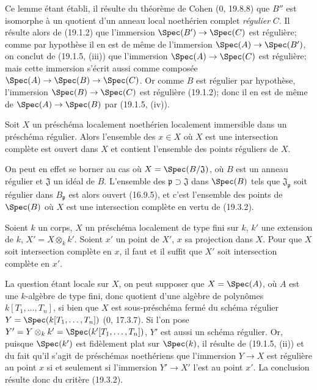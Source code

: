 Ce lemme étant établi, il résulte du théorème de Cohen ($0$, 19.8.8) que $B''$ est isomorphe à un quotient d'un anneau local noethérien complet \emph{régulier} $C$. Il résulte alors de (19.1.2) que l'immersion $\Spec(B')\to\Spec(C)$ est régulière; comme par hypothèse il en est de même de l'immersion $\Spec(A)\to\Spec(B')$, on conclut de (19.1.5, (iii)) que l'immersion $\Spec(A)\to\Spec(C)$ est régulière; mais cette immersion s'écrit aussi comme composée $\Spec(A)\to\Spec(B)\to\Spec(C)$. Or comme $B$ est régulier par hypothèse, l'immersion $\Spec(B)\to\Spec(C)$ est régulière (19.1.2); donc il en est de même de $\Spec(A)\to\Spec(B)$ par (19.1.5, (iv)).

\begin{corollary}[19.3.3]
\label{IV.19.3.3}
Soit $X$ un préschéma localement noethérien localement immersible dans un préschéma régulier. Alors l'ensemble des $x\in X$ où $X$ est une intersection complète est ouvert dans $X$ et contient l'ensemble des points réguliers de $X$.
\end{corollary}

On peut en effet se borner au cas où $X=\Spec(B/\mathfrak J)$, où $B$ est un anneau régulier et $\mathfrak J$ un idéal de $B$. L'ensemble des $\mathfrak p\supset\mathfrak J$ dans $\Spec(B)$ tels que $\mathfrak J_{\mathfrak p}$ soit régulier dans $B_{\mathfrak p}$ est alors ouvert (16.9.5), et c'est l'ensemble des points de $\Spec(B)$ où $X$ est une intersection complète en vertu de (19.3.2).

\begin{corollary}[19.3.4]
\label{IV.19.3.4}
Soient $k$ un corps, $X$ un préschéma localement de type fini sur $k$, $k'$ une extension de $k$, $X'=X\otimes_k k'$. Soient $x'$ un point de $X'$, $x$ sa projection dans $X$. Pour que $X$ soit intersection complète en $x$, il faut et il suffit que $X'$ soit intersection complète en $x'$.
\end{corollary}

La question étant locale sur $X$, on peut supposer que $X=\Spec(A)$, où $A$ est une $k$-algèbre de type fini, donc quotient d'une algèbre de polynômes $k[T_1,\ldots,T_n]$, si bien que $X$ est sous-préschéma fermé du schéma régulier $Y=\Spec(k[T_1,\ldots,T_n])$ ($0$, 17.3.7). Si l'on pose $Y'=Y\otimes_k k'=\Spec(k'[T_1,\ldots,T_n])$, $Y'$ est aussi un schéma régulier. Or, puisque $\Spec(k')$ est fidèlement plat sur $\Spec(k)$, il résulte de (19.1.5, (ii)) et du fait qu'il s'agit de préschémas noethériens que l'immersion $Y\to X$ est régulière au point $x$ si et seulement si l'immersion $Y'\to X'$ l'est au point $x'$. La conclusion résulte donc du critère (19.3.2).

